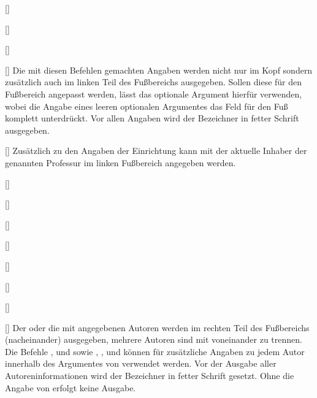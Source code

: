 \begin{Bundle*}{}
\begin{Declaration}{%
  []%
}
\begin{Declaration}{%
  []%
}
\begin{Declaration}{%
  []%
}
\begin{Declaration}{%
  []%
}
\printdeclarationlist%
%
Die mit diesen Befehlen gemachten Angaben werden nicht nur im Kopf sondern 
zusätzlich auch im linken Teil des Fußbereichs ausgegeben. Sollen diese für den 
Fußbereich angepasst werden, lässt das optionale Argument hierfür verwenden, 
wobei die Angabe eines leeren optionalen Argumentes das Feld für den Fuß 
komplett unterdrückt. Vor allen Angaben wird der Bezeichner  
in fetter Schrift ausgegeben.
\end{Declaration}
\end{Declaration}
\end{Declaration}
\end{Declaration}


\begin{Declaration}{[]}
\printdeclarationlist%
%
Zusätzlich zu den Angaben der Einrichtung kann mit  der 
aktuelle Inhaber der genannten Professur im linken Fußbereich angegeben werden.
\end{Declaration}

\begin{Declaration}{[]}
\begin{Declaration}{[]}
\begin{Declaration}{[]}
\begin{Declaration}{[]}
\begin{Declaration}{[]}
\begin{Declaration}{[]}
\begin{Declaration}{[]}
\begin{Declaration}{[]}
\printdeclarationlist%
%
Der oder die mit  angegebenen Autoren werden im rechten Teil des 
Fußbereichs (nacheinander) ausgegeben, mehrere Autoren sind mit  
voneinander zu trennen. Die Befehle ,  und 
 sowie , ,  und 
 können für zusätzliche Angaben zu jedem Autor innerhalb 
des Argumentes von  verwendet werden. Vor der Ausgabe aller 
Autoreninformationen wird der Bezeichner  in fetter Schrift 
gesetzt. Ohne die Angabe von  erfolgt keine Ausgabe. 


\end{Declaration}
\end{Declaration}
\end{Declaration}
\end{Declaration}
\end{Declaration}
\end{Declaration}
\end{Declaration}
\end{Declaration}
\end{Bundle*}
